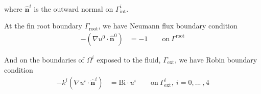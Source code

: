 where $\hat{\mathbf{n}}^i$ is the outward normal on $\Gamma^i_\text{int}$.

At the fin root boundary $\Gamma_\text{root}$, we have Neumann flux boundary condition
\begin{align}
    - (\nabla u^0\cdot \hat{\mathbf{n}}^0) &= -1 \qquad \text{on}\>\Gamma^\text{root}
\end{align}

And on the boundaries of $\Omega^i$ exposed to the fluid, $\Gamma_\text{ext}$, we have Robin boundary condition
\begin{align}
    -k^i (\nabla u^i\cdot \hat{\mathbf{n}}^i) &= \text{Bi}\cdot u^i
    \qquad \text{on}\>\Gamma^i_\text{ext},\>i=0,...\>,4
\end{align}
